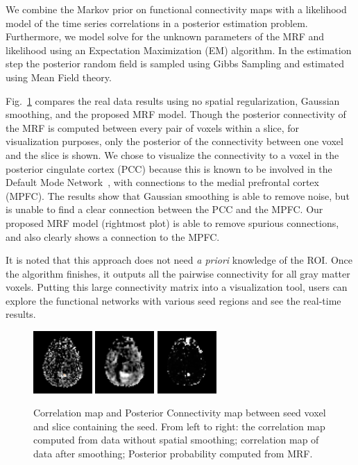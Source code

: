 \documentclass[12pt]{article}
\begin{document}
We combine the Markov prior on functional connectivity maps with a likelihood
model of the time series correlations in a posterior estimation problem.
Furthermore, we model solve for the unknown parameters of the MRF and likelihood
using an Expectation Maximization (EM) algorithm. In the estimation step the
posterior random field is sampled using Gibbs Sampling and estimated using Mean
Field theory.

Fig.~\ref{fig:mrfvssmoothing} compares the real data results using no spatial
regularization, Gaussian smoothing, and the proposed MRF model. Though the
posterior connectivity of the MRF is computed between every pair of voxels
within a slice, for visualization purposes, only the posterior of the
connectivity between one voxel and the slice is shown. We chose to visualize the
connectivity to a voxel in the posterior cingulate cortex (PCC) because this is
known to be involved in the Default Mode Network~\cite{raichle2001}, with
connections to the medial prefrontal cortex (MPFC). The results show that
Gaussian smoothing is able to remove noise, but is unable to find a clear
connection between the PCC and the MPFC. Our proposed MRF model (rightmost plot)
is able to remove spurious connections, and also clearly shows a connection to
the MPFC.

It is noted that this approach does not need \emph{a priori} knowledge of the
ROI. Once the algorithm finishes, it outputs all the pairwise connectivity for
all gray matter voxels. Putting this large connectivity matrix into a
visualization tool, users can explore the functional networks with various seed
regions and see the real-time results.

\begin{figure}[thb]
  \centering
  \includegraphics[width = 0.2\textwidth]{figures/no_overlay/R1_corr_nosmooth}
  \includegraphics[width = 0.2\textwidth]{figures/no_overlay/R1_corr_smooth}
  \includegraphics[width = 0.2\textwidth]{figures/no_overlay/R1_mrf}
  \caption{Correlation map and Posterior Connectivity map between seed voxel
    and slice containing the seed. From left to right: the correlation
    map computed from data without spatial smoothing;  correlation map of
    data after smoothing; Posterior probability computed from MRF.}
  \label{fig:mrfvssmoothing}
\end{figure}
\end{document}
